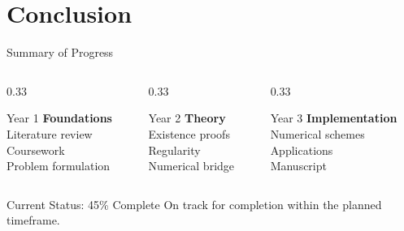 \documentclass[11pt]{beamer}
\begin{document}
	\section{Conclusion}
	
	\begin{frame}{Summary of Progress}
		\begin{columns}
			\begin{column}{0.33\textwidth}
				\begin{block}{Year 1}
					\centering
					\textbf{Foundations}\\
					\vspace{0.2cm}
					Literature review\\
					Coursework\\
					Problem formulation
				\end{block}
			\end{column}
			\begin{column}{0.33\textwidth}
				\begin{block}{Year 2}
					\centering
					\textbf{Theory}\\
					\vspace{0.2cm}
					Existence proofs\\
					Regularity\\
					Numerical bridge
				\end{block}
			\end{column}
			\begin{column}{0.33\textwidth}
				\begin{block}{Year 3}
					\centering
					\textbf{Implementation}\\
					\vspace{0.2cm}
					Numerical schemes\\
					Applications\\
					Manuscript
				\end{block}
			\end{column}
		\end{columns}
		
		\vspace{0.5cm}
		
		\begin{alertblock}{Current Status: 45\% Complete}
			On track for completion within the planned timeframe.
		\end{alertblock}
	\end{frame}
	
\end{document}
